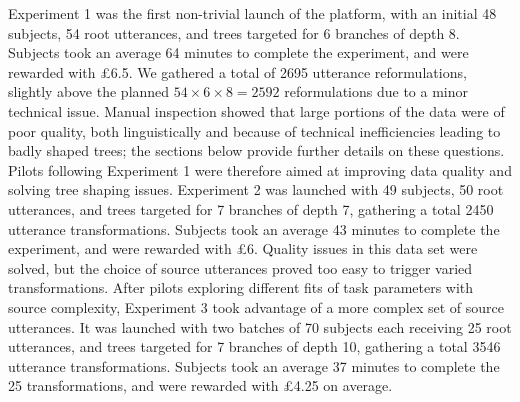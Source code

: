 Experiment 1 was the first non-trivial launch of the platform, with an
initial 48 subjects, 54 root utterances, and trees targeted for 6
branches of depth 8. Subjects took an average 64 minutes to complete the
experiment, and were rewarded with £6.5. We gathered a total of 2695 utterance reformulations, slightly above the planned \(54 \times 6 \times 8 = 2592\) reformulations due to a minor technical issue. 
Manual inspection
showed that large portions of the data were of poor quality, both
linguistically and because of technical inefficiencies leading to badly
shaped trees; the sections below provide further details on these
questions. Pilots following Experiment 1 were therefore aimed at
improving data quality and solving tree shaping issues. Experiment 2 was
launched with 49 subjects, 50 root utterances, and trees targeted for 7
branches of depth 7, gathering a total 2450 utterance transformations.
Subjects took an average 43 minutes to complete the experiment, and were
rewarded with £6. Quality issues in this data set were solved, but the
choice of source utterances proved too easy to trigger varied
transformations. After pilots exploring different fits of task
parameters with source complexity, Experiment 3 took advantage of a more
complex set of source utterances. It was launched with two batches of 70
subjects each receiving 25 root utterances, and trees targeted for 7
branches of depth 10, gathering a total 3546 utterance transformations.
Subjects took an average 37 minutes to complete the 25 transformations,
and were rewarded with £4.25 on average.


